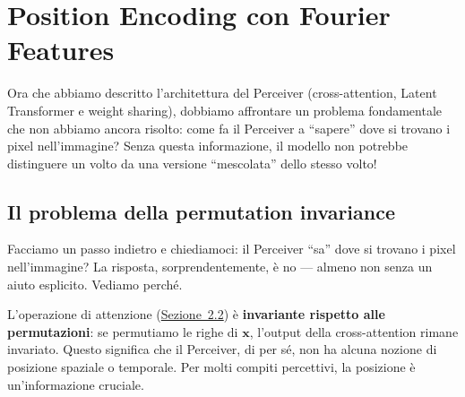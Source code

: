 \documentclass[12pt,a4paper]{article}
\begin{document}
\newpage
\section{Position Encoding con Fourier Features} \label{sec:fourier}

Ora che abbiamo descritto l'architettura del Perceiver (cross-attention, Latent Transformer e weight sharing), dobbiamo affrontare un problema fondamentale che non abbiamo ancora risolto: come fa il Perceiver a ``sapere'' dove si trovano i pixel nell'immagine? Senza questa informazione, il modello non potrebbe distinguere un volto da una versione ``mescolata'' dello stesso volto!

\subsection{Il problema della permutation invariance} \label{sec:perm_invariance}

Facciamo un passo indietro e chiediamoci: il Perceiver ``sa'' dove si trovano i pixel nell'immagine? La risposta, sorprendentemente, \`e no --- almeno non senza un aiuto esplicito. Vediamo perch\'e.

L'operazione di attenzione (\hyperref[sec:attention]{Sezione~2.2}) \`e \textbf{invariante rispetto alle permutazioni}: se permutiamo le righe di $\mathbf{x}$, l'output della cross-attention rimane invariato. Questo significa che il Perceiver, di per s\'e, non ha alcuna nozione di posizione spaziale o temporale. Per molti compiti percettivi, la posizione \`e un'informazione cruciale.
\end{document}
